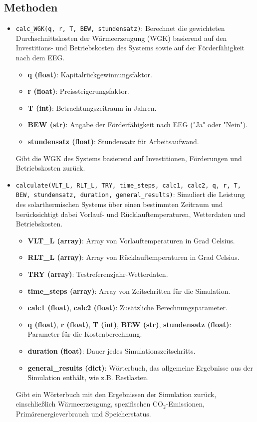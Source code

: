 \subsection{Methoden}
\begin{itemize}
    \item \texttt{calc\_WGK(q, r, T, BEW, stundensatz)}: Berechnet die gewichteten Durchschnittskosten der Wärmeerzeugung (WGK) basierend auf den Investitions- und Betriebskosten des Systems sowie auf der Förderfähigkeit nach dem EEG.
    \begin{itemize}
        \item \textbf{q (float)}: Kapitalrückgewinnungsfaktor.
        \item \textbf{r (float)}: Preissteigerungsfaktor.
        \item \textbf{T (int)}: Betrachtungszeitraum in Jahren.
        \item \textbf{BEW (str)}: Angabe der Förderfähigkeit nach EEG ("Ja" oder "Nein").
        \item \textbf{stundensatz (float)}: Stundensatz für Arbeitsaufwand.
    \end{itemize}
    Gibt die WGK des Systems basierend auf Investitionen, Förderungen und Betriebskosten zurück.

    \item \texttt{calculate(VLT\_L, RLT\_L, TRY, time\_steps, calc1, calc2, q, r, T, BEW, stundensatz, duration, general\_results)}: 
    Simuliert die Leistung des solarthermischen Systems über einen bestimmten Zeitraum und berücksichtigt dabei Vorlauf- und Rücklauftemperaturen, Wetterdaten und Betriebskosten.
    \begin{itemize}
        \item \textbf{VLT\_L (array)}: Array von Vorlauftemperaturen in Grad Celsius.
        \item \textbf{RLT\_L (array)}: Array von Rücklauftemperaturen in Grad Celsius.
        \item \textbf{TRY (array)}: Testreferenzjahr-Wetterdaten.
        \item \textbf{time\_steps (array)}: Array von Zeitschritten für die Simulation.
        \item \textbf{calc1 (float)}, \textbf{calc2 (float)}: Zusätzliche Berechnungsparameter.
        \item \textbf{q (float)}, \textbf{r (float)}, \textbf{T (int)}, \textbf{BEW (str)}, \textbf{stundensatz (float)}: Parameter für die Kostenberechnung.
        \item \textbf{duration (float)}: Dauer jedes Simulationszeitschritts.
        \item \textbf{general\_results (dict)}: Wörterbuch, das allgemeine Ergebnisse aus der Simulation enthält, wie z.B. Restlasten.
    \end{itemize}
    Gibt ein Wörterbuch mit den Ergebnissen der Simulation zurück, einschließlich Wärmeerzeugung, spezifischen CO$_2$-Emissionen, Primärenergieverbrauch und Speicherstatus.


\end{itemize}
